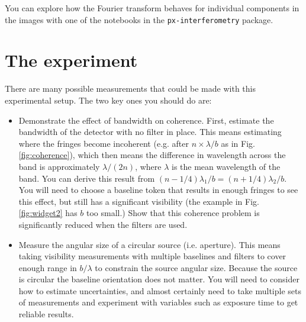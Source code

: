 \documentclass[11pt]{article}
\begin{document}
You can explore how the Fourier transform behaves for individual components in the images with one of the notebooks in the \texttt{px-interferometry} package.

\clearpage
\section{The experiment}

There are many possible measurements that could be made with this experimental setup. The two key ones you should do are:
\begin{itemize}
    \item Demonstrate the effect of bandwidth on coherence. First, estimate the bandwidth of the detector with no filter in place. This means estimating where the fringes become incoherent (e.g. after $n \times \lambda/b$ as in Fig. \ref{fig:coherence}), which then means the difference in wavelength across the band is approximately $\lambda/(2n)$, where $\lambda$ is the mean wavelength of the band. You can derive this result from $(n-1/4)\lambda_1/b = (n+1/4)\lambda_2/b$. You will need to choose a baseline token that results in enough fringes to see this effect, but still has a significant visibility (the example in Fig. \ref{fig:widget2} has $b$ too small.) Show that this coherence problem is significantly reduced when the filters are used.
    \item Measure the angular size of a circular source (i.e. aperture). This means taking visibility measurements with multiple baselines and filters to cover enough range in $b/\lambda$ to constrain the source angular size. Because the source is circular the baseline orientation does not matter. You will need to consider how to estimate uncertainties, and almost certainly need to take multiple sets of measurements and experiment with variables such as exposure time to get reliable results.
\end{itemize}
\end{document}
